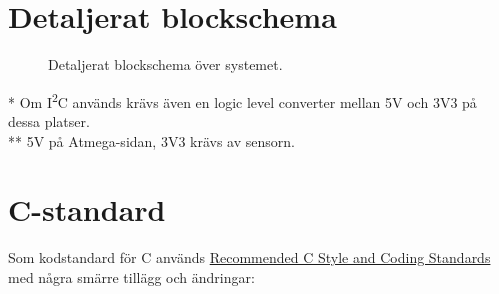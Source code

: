 \documentclass[a4paper,11pt]{article}
\begin{document}
\newpage
\begin{appendices}

\section{Detaljerat blockschema}
\begin{figure}[h!]
    \caption{Detaljerat blockschema över systemet.}
    \label{fig:modulesDetailed}
\end{figure}
* Om I\textsuperscript{2}C används krävs även en logic level converter mellan 5V och 3V3 på dessa platser.\\
** 5V på Atmega-sidan, 3V3 krävs av sensorn.

\section{C-standard} \label{sec:cstandard}
Som kodstandard för C används \href{https://www.doc.ic.ac.uk/lab/cplus/cstyle.html#N10940}{Recommended C Style and Coding Standards} med några smärre tillägg och ändringar:


\end{appendices}
\end{document}
